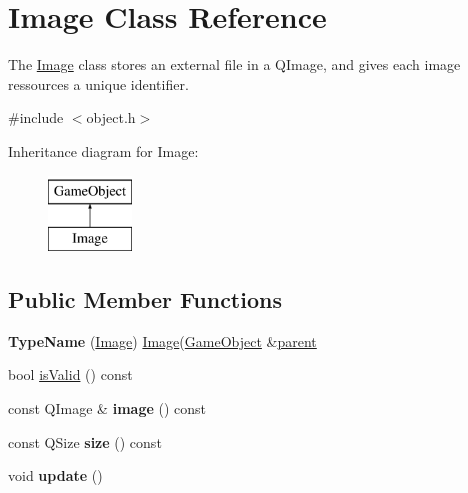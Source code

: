 \hypertarget{class_image}{\section{\-Image \-Class \-Reference}
\label{class_image}
}


\-The \hyperlink{class_image}{\-Image} class stores an external file in a \-Q\-Image, and gives each image ressources a unique identifier.  




{\ttfamily \#include $<$object.\-h$>$}

\-Inheritance diagram for \-Image\-:\begin{figure}[H]
\begin{center}
\leavevmode
\includegraphics[height=2.000000cm]{class_image}
\end{center}
\end{figure}
\subsection*{\-Public \-Member \-Functions}
\begin{DoxyCompactItemize}
\item 
\hypertarget{class_image_a0a63f452fb75e54d2d801cd88b968fc7}{{\bfseries \-Type\-Name} (\hyperlink{class_image}{\-Image}) \hyperlink{class_image}{\-Image}(\hyperlink{class_game_object}{\-Game\-Object} \&\hyperlink{class_game_object_af3deaf39cde23c189765634e32e95bb4}{parent}}\label{class_image_a0a63f452fb75e54d2d801cd88b968fc7}

\item 
bool \hyperlink{class_image_a0bc052fef9ea98e416e11af385cd93b4}{is\-Valid} () const 
\item 
\hypertarget{class_image_abad14459f8cc7bea0ce1b9ce1c41bad1}{const \-Q\-Image \& {\bfseries image} () const }\label{class_image_abad14459f8cc7bea0ce1b9ce1c41bad1}

\item 
\hypertarget{class_image_a62eb0299b2a5109afb31321cba7d4fc8}{const \-Q\-Size {\bfseries size} () const }\label{class_image_a62eb0299b2a5109afb31321cba7d4fc8}

\item 
\hypertarget{class_image_aa4f881e18d7b454ca185c05ec8e70b6d}{void {\bfseries update} ()}\label{class_image_aa4f881e18d7b454ca185c05ec8e70b6d}

\end{DoxyCompactItemize}
